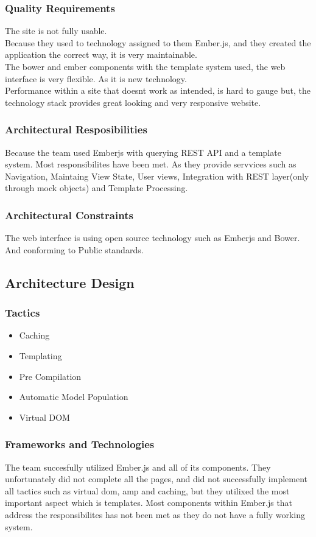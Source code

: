 \documentclass[a4paper,10pt]{article}
\begin{document}
    \subsubsection{Quality Requirements}
      The site is not fully usable.\\
      Because they used to technology assigned to them Ember.js, and they created the application the correct way, it is very maintainable.\\
      The bower and ember components with the template system used, the web interface is very flexible. As it is new technology.\\
      Performance within a site that doesnt work as intended, is hard to gauge but, the technology stack provides great looking and very responsive website.
    \subsubsection{Architectural Resposibilities}
      Because the team used Emberjs with querying REST API and a template system. Most responsibilites have been met. As they provide servvices such as Navigation, Maintaing View State, User views, Integration with REST layer(only through mock objects) and Template Processing.
    \subsubsection{Architectural Constraints}
      The web interface is using open source technology such as Emberjs and Bower. And conforming to Public standards.
  \subsection{Architecture Design}
    \subsubsection{Tactics}
      \begin{itemize}
        \item Caching
        \item Templating
        \item Pre Compilation
        \item Automatic Model Population
        \item Virtual DOM
      \end{itemize}
    \subsubsection{Frameworks and Technologies}
      The team succesfully utilized Ember.js and all of its components. They unfortunately did not complete all the pages, and did not successfully implement all tactics such as virtual dom, amp and caching, but they utilixed the most important aspect which is templates. Most components within Ember.js that address the responsibilites has not been met as they do not have a fully working system.
\end{document}
